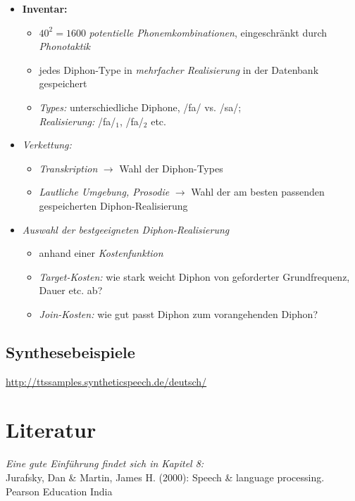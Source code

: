 \documentclass[11pt]{book}
\begin{document}
 


\begin{itemize}
\item {\bf Inventar:}
\begin{itemize}
\item $40^2=1600$ \emph{potentielle Phonemkombinationen}, eingeschränkt durch \emph{Phonotaktik}
\item jedes Diphon-Type in \emph{mehrfacher Realisierung} in der Datenbank gespeichert
\item \emph{Types:} unterschiedliche Diphone, /fa/ vs. /sa/;\\\emph{Realisierung:} /fa/$_1$, /fa/$_2$ etc.
\end{itemize}
\item \emph{Verkettung:}
\begin{itemize}
\item \emph{Transkription} $\longrightarrow$ Wahl der Diphon-Types
\item \emph{Lautliche Umgebung, Prosodie} $\longrightarrow$ Wahl der am besten passenden gespeicherten Diphon-Realisierung 
\end{itemize}
\end{itemize}

\begin{itemize}
\item \emph{Auswahl der bestgeeigneten Diphon-Realisierung}
\begin{itemize}
\item anhand einer \emph{Kostenfunktion}
\item \emph{Target-Kosten:} wie stark weicht Diphon von geforderter Grundfrequenz, Dauer etc. ab?
\item \emph{Join-Kosten:} wie gut passt Diphon zum vorangehenden Diphon?
\end{itemize}
\end{itemize}

\subsection*{Synthesebeispiele}

\url{http://ttssamples.syntheticspeech.de/deutsch/}


\section{Literatur}


\emph{Eine gute Einführung findet sich in Kapitel 8:}\\
Jurafsky, Dan \& Martin, James H. (2000): Speech \& language processing. Pearson Education India
\end{document}
